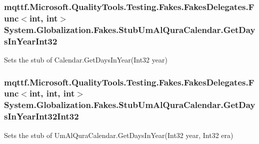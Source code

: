 \hypertarget{class_system_1_1_globalization_1_1_fakes_1_1_stub_um_al_qura_calendar_a658ece0feea44be3a3b467e2b20e01a5}{
\subsubsection[{Get\-Days\-In\-Year\-Int32}]{\setlength{\rightskip}{0pt plus 5cm}mqttf.\-Microsoft.\-Quality\-Tools.\-Testing.\-Fakes.\-Fakes\-Delegates.\-Func$<$int, int$>$ System.\-Globalization.\-Fakes.\-Stub\-Um\-Al\-Qura\-Calendar.\-Get\-Days\-In\-Year\-Int32}}\label{class_system_1_1_globalization_1_1_fakes_1_1_stub_um_al_qura_calendar_a658ece0feea44be3a3b467e2b20e01a5}


Sets the stub of Calendar.\-Get\-Days\-In\-Year(\-Int32 year)

\hypertarget{class_system_1_1_globalization_1_1_fakes_1_1_stub_um_al_qura_calendar_a9e9053e5d487900362f9607e15637b00}{
\subsubsection[{Get\-Days\-In\-Year\-Int32\-Int32}]{\setlength{\rightskip}{0pt plus 5cm}mqttf.\-Microsoft.\-Quality\-Tools.\-Testing.\-Fakes.\-Fakes\-Delegates.\-Func$<$int, int, int$>$ System.\-Globalization.\-Fakes.\-Stub\-Um\-Al\-Qura\-Calendar.\-Get\-Days\-In\-Year\-Int32\-Int32}}\label{class_system_1_1_globalization_1_1_fakes_1_1_stub_um_al_qura_calendar_a9e9053e5d487900362f9607e15637b00}


Sets the stub of Um\-Al\-Qura\-Calendar.\-Get\-Days\-In\-Year(\-Int32 year, Int32 era)

